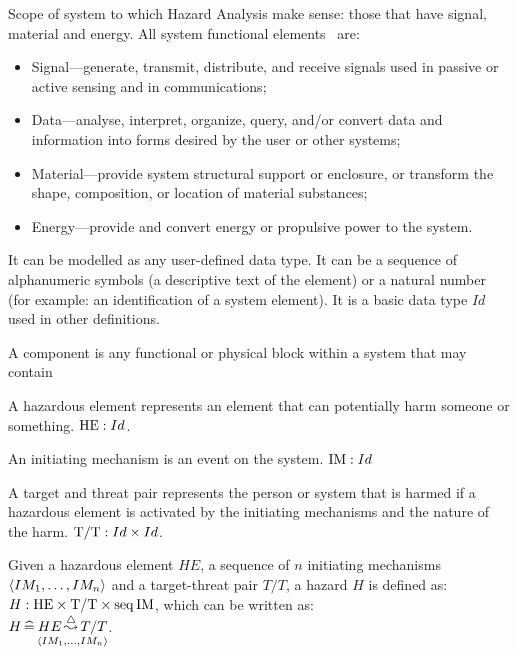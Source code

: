 Scope of system to which Hazard Analysis make sense: those that have signal, material and energy.
%
All system functional elements~\cite[p. 47]{KSS+2011} are:
\begin{itemize}
  \item Signal---generate, transmit, distribute, and receive signals used in passive or active sensing and in communications;
  \item Data---analyse, interpret, organize, query, and/or convert data and information into forms desired by the user or other systems;
  \item Material---provide system structural support or enclosure, or transform the shape, composition, or location of material substances;
  \item Energy---provide and convert energy or propulsive power to the system.
\end{itemize}

\begin{definition}[Identifier]
It can be modelled as any user-defined data type. It can be a sequence of alphanumeric symbols (a descriptive text of the element) or a natural number (for example: an identification of a system element). It is a basic data type $Id$ used in other definitions.
\end{definition}

\begin{definition}[Component]
A component is any functional or physical block within a system that may contain 
\end{definition}

\begin{definition}
A hazardous element represents an element that can potentially harm someone or something.
$\hmdatatypeHE: Id$.
\end{definition}

\begin{definition}
An initiating mechanism is an event on the system.
%
$\hmdatatypeIM: Id$
\end{definition}

\begin{definition}
A target and threat pair represents the person or system that is harmed if a hazardous element is activated by the initiating mechanisms and the nature of the harm. 
%
$\hmdatatypeTT: \hmcartesian{Id}{Id}$.
\end{definition}

\begin{definition}[Hazard]
Given a hazardous element $HE$, a sequence of $n$ initiating mechanisms $\hmseqenum{IM_1, \ldots, IM_n}$ and a target-threat pair $T/T$, a hazard $H$ is defined as: 
%
$H: \hmcartesian{\hmcartesian{\hmdatatypeHE}{\hmdatatypeTT}}{\hmseq \hmdatatypeIM}$,
%
which can be written as:
%
\\$H \hmdefs \hmhazard{HE}{\hmseqenum{IM_1, \ldots, IM_n}}{T/T}$.
\end{definition}

